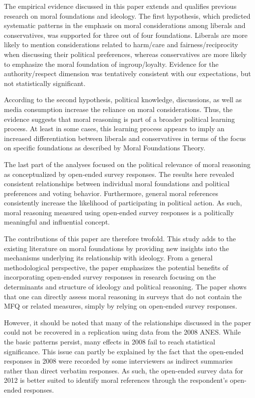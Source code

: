 \documentclass[12pt]{article}
\begin{document}
The empirical evidence discussed in this paper extends and qualifies previous research on moral foundations and ideology. The first hypothesis, which predicted systematic patterns in the emphasis on moral considerations among liberals and conservatives, was supported for three out of four foundations. Liberals are more likely to mention considerations related to harm/care and fairness/reciprocity when discussing their political preferences, whereas conservatives are more likely to emphasize the moral foundation of ingroup/loyalty. Evidence for the authority/respect dimension was tentatively consistent with our expectations, but not statistically significant.

According to the second hypothesis, political knowledge, discussions, as well as media consumption increase the reliance on moral considerations. Thus, the evidence suggests that moral reasoning is part of a broader political learning process. At least in some cases, this learning process appears to imply an increased differentiation between liberals and conservatives in terms of the focus on specific foundations as described by Moral Foundations Theory.

The last part of the analyses focused on the political relevance of moral reasoning as conceptualized by open-ended survey responses. The results here revealed consistent relationships between individual moral foundations and political preferences and voting behavior. Furthermore, general moral references consistently increase the likelihood of participating in political action. As such, moral reasoning measured using open-ended survey responses is a politically meaningful and influential concept.

The contributions of this paper are therefore twofold. This study adds to the existing literature on moral foundations by providing new insights into the mechanisms underlying its relationship with ideology. From a general methodological perspective, the paper emphasizes the potential benefits of incorporating open-ended survey responses in research focusing on the determinants and structure of ideology and political reasoning. The paper shows that one can directly assess moral reasoning in surveys that do not contain the MFQ or related measures, simply by relying on open-ended survey responses.

However, it should be noted that many of the relationships discussed in the paper could not be recovered in a replication using data from the 2008 ANES. While the basic patterns persist, many effects in 2008 fail to reach statistical significance. This issue can partly be explained by the fact that the open-ended responses in 2008 were recorded by some interviewers as indirect summaries rather than direct verbatim responses. As such, the open-ended survey data for 2012 is better suited to identify moral references through the respondent's open-ended responses.
\end{document}
